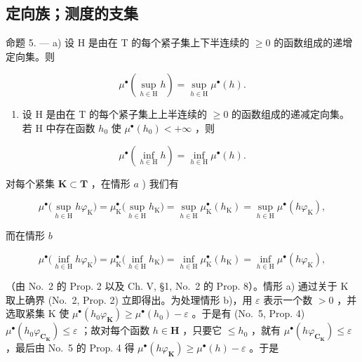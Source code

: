\subsection{定向族；测度的支集}

命题 5. --- a) 设 H 是由在 T 的每个紧子集上下半连续的 \(\geqslant 0\) 的函数组成的递增定向集。则

\[
\mu^ {\bullet} \left(\sup _ {h \in \mathrm{H}} h\right) = \sup _ {h \in \mathrm{H}} \mu^ {\bullet} (h).\tag{5}
\]

\begin{enumerate}
\def\labelenumi{\alph{enumi})}
\setcounter{enumi}{1}
\tightlist
\item
  设 H 是由在 T 的每个紧子集上上半连续的 \(\geqslant0\) 的函数组成的递减定向集。若 H 中存在函数 \(h_{0}\) 使 \(\mu^{\bullet}(h_{0})<+\infty\) ，则
\end{enumerate}

\[
\mu^ {\bullet} \left(\inf _ {h \in \mathrm{H}} h\right) = \inf _ {h \in \mathrm{H}} \mu^ {\bullet} (h).\tag{6}
\]

对每个紧集 \(\mathbf{K} \subset \mathbf{T}\) ，在情形 \(a\) ) 我们有

\[
\mu^ {\bullet} \Big (\sup _ {h \in \mathrm{H}} h \varphi_ {\mathrm{K}} \Big) = \mu_ {\mathrm{K}} ^ {\bullet} \Big (\sup _ {h \in \mathrm{H}} h _ {\mathrm{K}} \Big) = \sup _ {h \in \mathrm{H}} \mu_ {\mathrm{K}} ^ {\bullet} (h _ {\mathrm{K}}) = \sup _ {h \in \mathrm{H}} \mu^ {\bullet} (h \varphi_ {\mathrm{K}}),
\]

而在情形 \(b\)

\[
\mu^ {\bullet} \Big (\inf _ {h \in \mathrm{H}} h \varphi_ {\mathrm{K}} \Big) = \mu_ {\mathrm{K}} ^ {\bullet} \Big (\inf _ {h \in \mathrm{H}} h _ {\mathrm{K}} \Big) = \inf _ {h \in \mathrm{H}} \mu_ {\mathrm{K}} ^ {\bullet} (h _ {\mathrm{K}}) = \inf _ {h \in \mathrm{H}} \mu^ {\bullet} (h \varphi_ {\mathrm{K}}),
\]

（由 No.~2 的 Prop. 2 以及 Ch. V, §1, No.~2 的 Prop. 8）。情形 a) 通过关于 K 取上确界 (No.~2, Prop. 2) 立即得出。为处理情形 b)，用 \(\varepsilon\) 表示一个数 \(>0\) ，并选取紧集 K 使 \(\mu^{\bullet}(h_0\varphi_{\mathbf{K}}) \geqslant \mu^{\bullet}(h_0) - \varepsilon\) 。于是有 (No.~5, Prop. 4) \(\mu^{\bullet}(h_0\varphi_{\mathbf{C}_{\mathbf{K}}}) \leqslant \varepsilon\) ；故对每个函数 \(h \in \mathbf{H}\) ，只要它 \(\leqslant h_0\) ，就有 \(\mu^{\bullet}(h\varphi_{\mathbf{C}_{\mathbf{K}}}) \leqslant \varepsilon\) ，最后由 No.~5 的 Prop. 4 得 \(\mu^{\bullet}(h\varphi_{\mathbf{K}}) \geqslant \mu^{\bullet}(h) - \varepsilon\) 。于是

